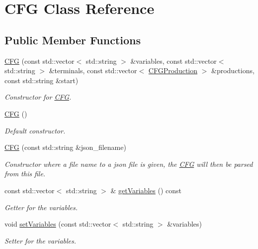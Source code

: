 \hypertarget{classCFG}{}\section{C\+FG Class Reference}
\label{classCFG}
\subsection*{Public Member Functions}
\begin{DoxyCompactItemize}
\item 
\hyperlink{classCFG_aaa7b7d1a1686837e3adbad02a60c7222}{C\+FG} (const std\+::vector$<$ std\+::string $>$ \&variables, const std\+::vector$<$ std\+::string $>$ \&terminals, const std\+::vector$<$ \hyperlink{classCFGProduction}{C\+F\+G\+Production} $>$ \&productions, const std\+::string \&start)
\begin{DoxyCompactList}\small\item\em Constructor for \hyperlink{classCFG}{C\+FG}. \end{DoxyCompactList}\item 
\mbox{\label{classCFG_a6a6d74b60d6abc9b91031aaac23067ff}} 
\hyperlink{classCFG_a6a6d74b60d6abc9b91031aaac23067ff}{C\+FG} ()
\begin{DoxyCompactList}\small\item\em Default constructor. \end{DoxyCompactList}\item 
\hyperlink{classCFG_a01910c6d43cec0d8c07c5f8ef99dc583}{C\+FG} (const std\+::string \&json\+\_\+filename)
\begin{DoxyCompactList}\small\item\em Constructor where a file name to a json file is given, the \hyperlink{classCFG}{C\+FG} will then be parsed from this file. \end{DoxyCompactList}\item 
const std\+::vector$<$ std\+::string $>$ \& \hyperlink{classCFG_ac025bd0d80e2240419aa93a2febb97f3}{get\+Variables} () const
\begin{DoxyCompactList}\small\item\em Getter for the variables. \end{DoxyCompactList}\item 
void \hyperlink{classCFG_a5cbdb89aa2f3721e651a177e730fa850}{set\+Variables} (const std\+::vector$<$ std\+::string $>$ \&variables)
\begin{DoxyCompactList}\small\item\em Setter for the variables. \end{DoxyCompactList}\item 

\end{DoxyCompactItemize}
